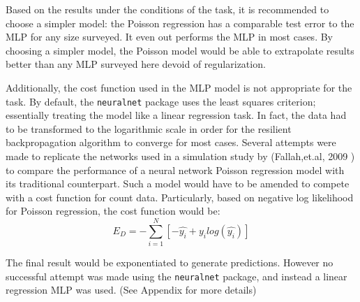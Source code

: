 Based on the results under the conditions of the task, it is recommended to choose a simpler model: the Poisson regression has a comparable test error to the MLP for any size surveyed.  It even out performs the MLP in most cases.  By choosing a simpler model, the Poisson model would be able to extrapolate results better than any MLP surveyed here devoid of regularization.

Additionally, the cost function used in the MLP model is not appropriate for the task.  By default, the \texttt{neuralnet} package uses the least squares criterion; essentially treating the model like a linear regression task.  In fact, the data had to be transformed to the logarithmic scale in order for the resilient backpropagation algorithm to converge for most cases.  Several attempts were made to replicate the networks used in a simulation study by (Fallah,et.al, 2009 \cite{fallah2009nonlinear}) to compare the performance of a neural network Poisson regression model with its traditional counterpart.  Such a model would have to be amended to compete with a cost function for count data.  Particularly, based on negative log likelihood for Poisson regression, the cost function would be:
$$
E_D = - \sum_{i=1}^N \left[ -\hat{y_i} + y_i log(\hat{y_i}) \right]
$$

The final result would be exponentiated to generate predictions.
However no successful attempt was made using the \texttt{neuralnet} package, and instead a linear regression MLP was used. (See Appendix for more details)
